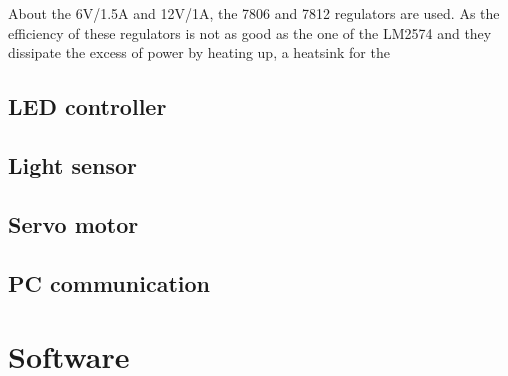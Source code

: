 \documentclass[12pt,a4paper]{article}
\begin{document}
About the 6V/1.5A and 12V/1A, the 7806 and 7812 regulators are used. As the efficiency of these regulators is not as good as the one of the LM2574 and they dissipate the excess of power by heating up, a heatsink for the 

\subsection{LED controller}

\subsection{Light sensor}

\subsection{Servo motor}

\subsection{PC communication}

\section{Software}
\end{document}
